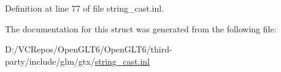 Definition at line 77 of file string\+\_\+cast.\+inl.



The documentation for this struct was generated from the following file\+:\begin{DoxyCompactItemize}
\item 
D\+:/\+V\+C\+Repos/\+Open\+G\+L\+T6/\+Open\+G\+L\+T6/third-\/party/include/glm/gtx/\mbox{\hyperlink{string__cast_8inl}{string\+\_\+cast.\+inl}}\end{DoxyCompactItemize}
